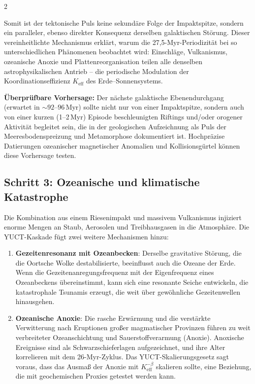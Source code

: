 \documentclass[11pt,a4paper]{article}
\begin{document}
	\begin{multicols}{2}
		
		Somit ist der tektonische Puls keine sekundäre Folge der Impaktspitze, sondern ein
		paralleler, ebenso direkter Konsequenz derselben galaktischen Störung.
		Dieser vereinheitlichte Mechanismus erklärt, warum die 27,5-Myr-Periodizität bei so
		unterschiedlichen Phänomenen beobachtet wird: Einschläge, Vulkanismus, ozeanische Anoxie und Plattenreorganisation
		teilen alle denselben astrophysikalischen Antrieb – die periodische Modulation der Koordinationseffizienz
		\(K_{\mathrm{eff}}\) des Erde–Sonnensystems.
		
		\vspace{0.2cm}
		\noindent
		\textbf{Überprüfbare Vorhersage:} Der nächste galaktische Ebenendurchgang (erwartet in \(\sim 92\)–\(96\) Myr)
		sollte nicht nur von einer Impaktspitze, sondern auch von einer kurzen (1–2 Myr) Episode
		beschleunigten Riftings und/oder orogener Aktivität begleitet sein, die in der geologischen Aufzeichnung als
		Puls der Meeresbodenspreizung und Metamorphose dokumentiert ist. Hochpräzise Datierungen ozeanischer magnetischer
		Anomalien und Kollisionsgürtel können diese Vorhersage testen.
		
		\subsection{Schritt 3: Ozeanische und klimatische Katastrophe}
		
		Die Kombination aus einem Riesenimpakt und massivem Vulkanismus injiziert enorme
		Mengen an Staub, Aerosolen und Treibhausgasen in die Atmosphäre.
		Die YUCT-Kaskade fügt zwei weitere Mechanismen hinzu:
		\begin{enumerate}
			\item \textbf{Gezeitenresonanz mit Ozeanbecken}: Derselbe
			gravitative Störung, die die Oortsche Wolke destabilisierte, beeinflusst auch
			die Ozeane der Erde. Wenn die Gezeitenanregungsfrequenz mit der
			Eigenfrequenz eines Ozeanbeckens übereinstimmt, kann sich eine resonante Seiche entwickeln,
			die katastrophale Tsunamis erzeugt, die weit über gewöhnliche Gezeitenwellen hinausgehen.
			\item \textbf{Ozeanische Anoxie}: Die rasche Erwärmung und die verstärkte
			Verwitterung nach Eruptionen großer magmatischer Provinzen führen zu
			weit verbreiteter Ozeanschichtung und Sauerstoffverarmung (Anoxie).
			Anoxische Ereignisse sind als Schwarzschieferlagen aufgezeichnet, und ihre Alter
			korrelieren mit dem 26-Myr-Zyklus. Das YUCT-Skalierungsgesetz sagt voraus,
			dass das Ausmaß der Anoxie mit \(K_{\mathrm{eff}}^{-\beta}\) skalieren sollte,
			eine Beziehung, die mit geochemischen Proxies getestet werden kann.
		\end{enumerate}
		

\end{multicols}
\end{document}
